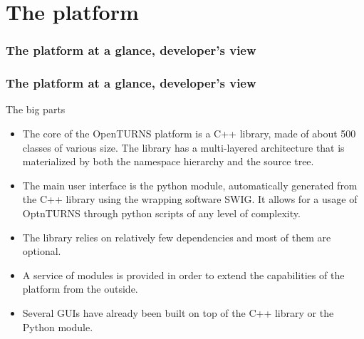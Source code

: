 \documentclass[8pt]{beamer}
\begin{document}
\section[The platform]{The platform}
\begin{frame}
  \frametitle{The platform at a glance, developer's view}
  \centering {}
\end{frame}
\begin{frame}
  \frametitle{The platform at a glance, developer's view}
  \begin{block}{The big parts}
    \begin{itemize}
    \item The \alert{core} of the OpenTURNS platform is a \alert{C++ library}, made of about 500 classes of various size. The library has a multi-layered architecture that is materialized by both the namespace hierarchy and the source tree.
    \item The \alert{main user interface} is the \alert{python module}, automatically generated from the C++ library using the wrapping software SWIG. It allows for a usage of OptnTURNS through python scripts of any level of complexity.
    \item The library relies on relatively \alert{few dependencies} and most of them are optional.
    \item A service of \alert{modules} is provided in order to extend the capabilities of the platform from the outside.
    \item Several \alert{GUIs} have already been built on top of the C++ library or the Python module.
    \end{itemize}
  \end{block}
\end{frame}
\end{document}
